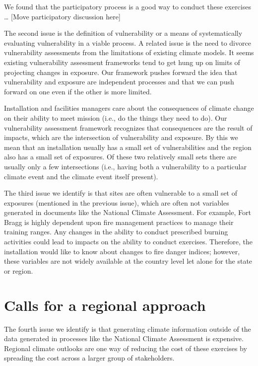 \documentclass[10pt]{amsart}
\begin{document}
We found that the participatory process is a good way to conduct these exercises \ldots
[Move participatory discussion here]

The second issue is the definition of vulnerability or a means of systematically evaluating vulnerability in a viable process.
A related issue is the need to divorce vulnerability assessments from the limitations of existing climate models.
It seems existing vulnerability assessment frameworks tend to get hung up on limits of projecting changes in exposure.
Our framework pushes forward the idea that vulnerability and exposure are independent processes and that we can push forward on one even if the other is more limited. 

Installation and facilities managers care about the consequences of climate change on their ability to meet mission (i.e., do the things they need to do).
Our vulnerability assessment framework recognizes that consequences are the result of impacts, which are the intersection of vulnerability and exposure.
By this we mean that an installation usually has a small set of vulnerabilities and the region also has a small set of exposures. 
Of these two relatively small sets there are usually only a few intersections (i.e., having both a vulnerability to a particular climate event and the climate event itself present).

The third issue we identify is that sites are often vulnerable to a small set of exposures (mentioned in the previous issue), which are often not variables generated in documents like the National Climate Assessment.
For example, Fort Bragg is highly dependent upon fire management practices to manage their training ranges. 
Any changes in the ability to conduct prescribed burning activities could lead to impacts on the ability to conduct exercises.
Therefore, the installation would like to know about changes to fire danger indices; however, these variables are not widely available at the country level let alone for the state or region.

\section{Calls for a regional approach}
The fourth issue we identify is that generating climate information outside of the data generated in processes like the National Climate Assessment is expensive.
Regional climate outlooks are one way of reducing the cost of these exercises by spreading the cost across a larger group of stakeholders.
\end{document}
